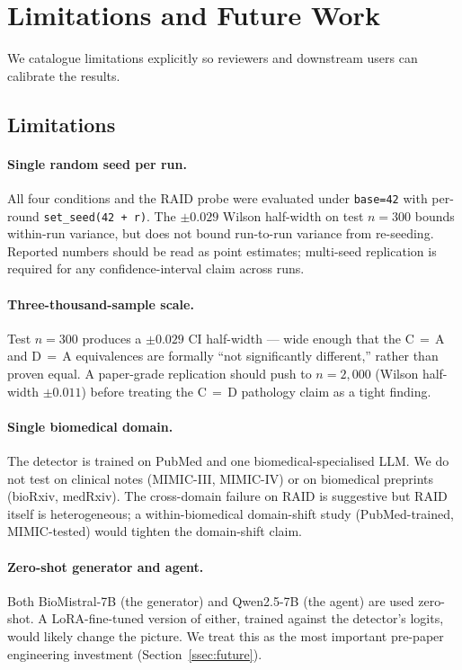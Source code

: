 \section{Limitations and Future Work}
\label{sec:limitations}

We catalogue limitations explicitly so reviewers and downstream users can
calibrate the results.

\subsection{Limitations}

\paragraph{Single random seed per run.}
All four conditions and the RAID probe were evaluated under
\texttt{base=42} with per-round \texttt{set\_seed(42 + r)}. The
\(\pm 0.029\) Wilson half-width on test \(n=300\) bounds within-run
variance, but does not bound run-to-run variance from re-seeding.
Reported numbers should be read as point estimates; multi-seed
replication is required for any confidence-interval claim across
runs.

\paragraph{Three-thousand-sample scale.}
Test \(n=300\) produces a \(\pm 0.029\) CI half-width — wide enough that
the C\,$=$\,A and D\,$=$\,A equivalences are formally ``not significantly
different,'' rather than proven equal. A paper-grade replication should
push to \(n=2{,}000\) (Wilson half-width \(\pm 0.011\)) before treating
the C\,$=$\,D pathology claim as a tight finding.

\paragraph{Single biomedical domain.}
The detector is trained on PubMed and one biomedical-specialised LLM. We
do not test on clinical notes (MIMIC-III, MIMIC-IV) or on biomedical
preprints (bioRxiv, medRxiv). The cross-domain failure on RAID is
suggestive but RAID itself is heterogeneous; a within-biomedical
domain-shift study (PubMed-trained, MIMIC-tested) would tighten the
domain-shift claim.

\paragraph{Zero-shot generator and agent.}
Both BioMistral-7B (the generator) and Qwen2.5-7B (the agent) are used
zero-shot. A LoRA-fine-tuned version of either, trained against the
detector's logits, would likely change the picture. We treat this as
the most important pre-paper engineering investment
(Section~\ref{ssec:future}).

